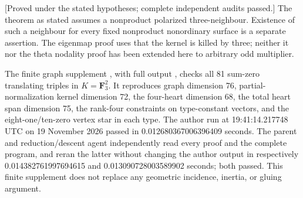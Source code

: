 \begin{remark}
\label{rem:nonordinary-degree-three-neighbour-scope-candidate}
\textup{[Proved under the stated hypotheses; complete independent audits passed.]}
The theorem as stated assumes a nonproduct polarized three-neighbour.
Existence of such a neighbour for every fixed nonproduct nonordinary
surface is a separate assertion. The eigenmap proof uses that the
kernel is killed by three; neither it nor the theta nodality proof
has been extended here to arbitrary odd multiplier.

The finite graph supplement
, with
full output
,
checks all 81 sum-zero translating triples in $K=\mathbf F_3^2$.
It reproduces graph dimension 76, partial-normalization kernel
dimension 72, the four-heart dimension 68, the total heart span
dimension 75, the rank-four constraints on type-constant vectors,
and the eight-one/ten-zero vertex star in each type. The author
run at 19:41:14.217748 UTC on 19 November 2026 passed in
0.012680367006396409 seconds. The parent and reduction/descent agent
independently read every proof and the complete program, and reran
the latter without changing the author output in respectively
0.014382761997694615 and 0.013090728003589902 seconds; both passed.
This finite supplement does not
replace any geometric incidence, inertia, or gluing argument.
\end{remark}
